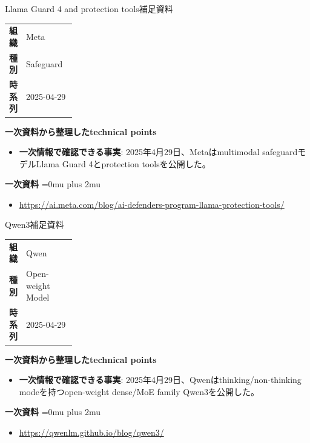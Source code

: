 \begin{technicalnote}{Llama Guard 4 and protection tools}{補足資料}
\begingroup
\begin{tabularx}{\linewidth}{@{}>{\bfseries}p{0.22\linewidth}X@{}}
組織 & Meta \\
種別 & Safeguard \\
時系列 & 2025-04-29 \\
\end{tabularx}
\smallskip
{\bfseries 一次資料から整理したtechnical points}
\begin{itemize}[leftmargin=1.5em,itemsep=0.35em]
\item \textbf{一次情報で確認できる事実}: 2025年4月29日、Metaはmultimodal safeguardモデルLlama Guard 4とprotection toolsを公開した。
\end{itemize}
\begin{samepage}
{\bfseries 一次資料}
\begingroup\sloppy
\Urlmuskip=0mu plus 2mu\relax
\begin{itemize}[leftmargin=1.5em,itemsep=0.25em]
\item {\scriptsize\url{https://ai.meta.com/blog/ai-defenders-program-llama-protection-tools/}}
\end{itemize}
\endgroup
\end{samepage}
\endgroup
\end{technicalnote}
\medskip

\begin{technicalnote}{Qwen3}{補足資料}
\begingroup
\begin{tabularx}{\linewidth}{@{}>{\bfseries}p{0.22\linewidth}X@{}}
組織 & Qwen \\
種別 & Open-weight Model \\
時系列 & 2025-04-29 \\
\end{tabularx}
\smallskip
{\bfseries 一次資料から整理したtechnical points}
\begin{itemize}[leftmargin=1.5em,itemsep=0.35em]
\item \textbf{一次情報で確認できる事実}: 2025年4月29日、Qwenはthinking/non-thinking modeを持つopen-weight dense/MoE family Qwen3を公開した。
\end{itemize}
\begin{samepage}
{\bfseries 一次資料}
\begingroup\sloppy
\Urlmuskip=0mu plus 2mu\relax
\begin{itemize}[leftmargin=1.5em,itemsep=0.25em]
\item {\scriptsize\url{https://qwenlm.github.io/blog/qwen3/}}
\end{itemize}
\endgroup
\end{samepage}
\endgroup
\end{technicalnote}
\medskip

